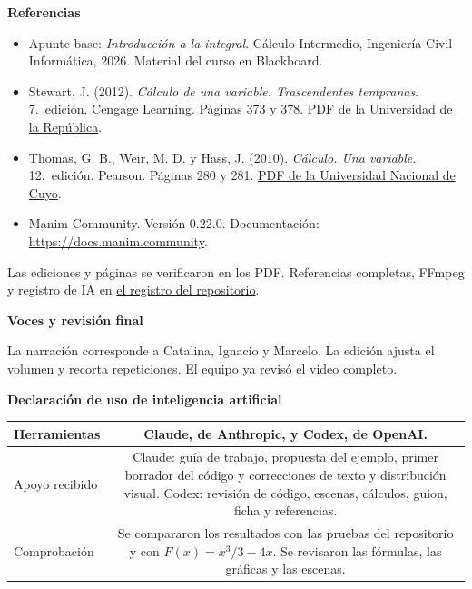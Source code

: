 \documentclass[10pt,a4paper]{article}
\newcommand{\apartado}[1]{\vspace{4pt}\textbf{\color{azul}#1}\par}
\begin{document}
\apartado{Referencias}
\begin{itemize}[leftmargin=1.2em,itemsep=1pt,topsep=1pt]
\item Apunte base: \emph{Introducción a la integral}. Cálculo Intermedio, Ingeniería Civil Informática, 2026. Material del curso en Blackboard.
\item Stewart, J. (2012). \emph{Cálculo de una variable. Trascendentes tempranas}. 7.\textordfeminine\ edición. Cengage Learning. Páginas 373 y 378. \href{https://eva.interior.udelar.edu.uy/pluginfile.php/96366/mod_resource/content/1/Stewart.\%20C\%C3\%A1lculo\%20de\%20una\%20variable..pdf}{PDF de la Universidad de la República}.
\item Thomas, G. B., Weir, M. D. y Hass, J. (2010). \emph{Cálculo. Una variable}. 12.\textordfeminine\ edición. Pearson. Páginas 280 y 281. \href{https://fcen.uncuyo.edu.ar/upload/calculo-de-una-variable-thomas-12ed.pdf}{PDF de la Universidad Nacional de Cuyo}.
\item Manim Community. Versión 0.22.0. Documentación: \url{https://docs.manim.community}.
\end{itemize}
Las ediciones y páginas se verificaron en los PDF. Referencias completas, FFmpeg y registro de IA en \href{https://github.com/CataVergara/EID-Calculo-Intermedio-MAT1188-/blob/main/docs/REFERENCIAS.md}{el registro del repositorio}.

\apartado{Voces y revisión final}
La narración corresponde a Catalina, Ignacio y Marcelo. La edición ajusta el volumen y recorta repeticiones. El equipo ya revisó el video completo.

\apartado{Declaración de uso de inteligencia artificial}
\begin{tabularx}{\textwidth}{|E|C|}
\hline
Herramientas & Claude, de Anthropic, y Codex, de OpenAI. \\\hline
Apoyo recibido & Claude: guía de trabajo, propuesta del ejemplo, primer borrador del código y correcciones de texto y distribución visual.\newline
Codex: revisión de código, escenas, cálculos, guion, ficha y referencias. \\\hline
Comprobación & Se compararon los resultados con las pruebas del repositorio y con $F(x)=x^3/3-4x$. Se revisaron las fórmulas, las gráficas y las escenas. \\\hline
\end{tabularx}
\end{document}
